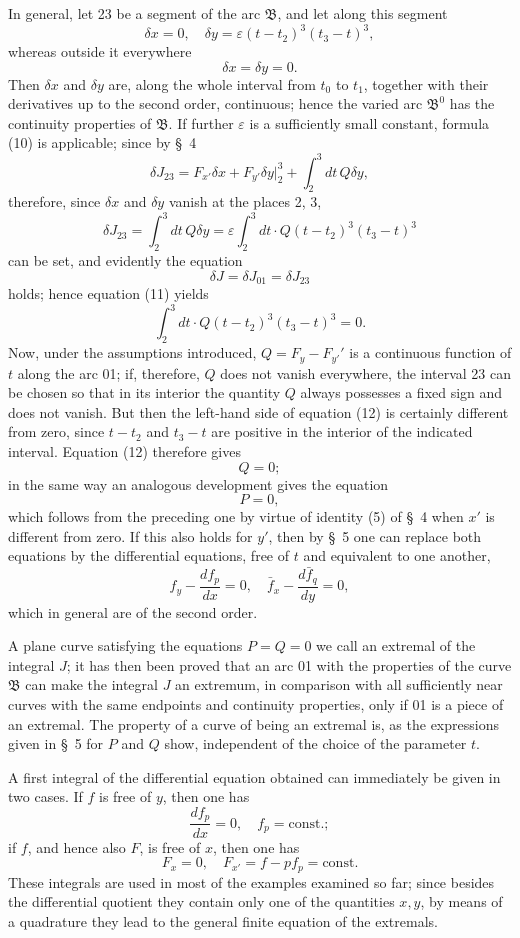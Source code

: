 \documentclass[11pt,a4paper,leqno]{article}
\begin{document}
In general, let 23 be a segment of the arc $\mathfrak{B}$, and let along this segment
\[
\delta x=0,\quad \delta y=\varepsilon(t-t_2)^3(t_3-t)^3,
\]
whereas outside it everywhere
\[
\delta x=\delta y=0.
\]
Then $\delta x$ and $\delta y$ are, along the whole interval from $t_0$ to $t_1$, together with their derivatives up to the second order, continuous; hence the varied arc $\mathfrak{B}^0$ has the continuity properties of $\mathfrak{B}$. If further $\varepsilon$ is a sufficiently small constant, formula (10) is applicable; since by \S~4
\[
\delta J_{23}=F_{x'}\delta x+F_{y'}\delta y\bigg|_2^3+\int_2^3 dt\,Q\delta y,
\]
therefore, since $\delta x$ and $\delta y$ vanish at the places 2, 3,
\[
\delta J_{23}=\int_2^3 dt\,Q\delta y=\varepsilon\int_2^3 dt\cdot Q(t-t_2)^3(t_3-t)^3
\]
can be set, and evidently the equation
\[
\delta J=\delta J_{01}=\delta J_{23}
\]
holds; hence equation (11) yields
\begin{equation}\tag{12}
\int_2^3 dt\cdot Q(t-t_2)^3(t_3-t)^3=0.
\end{equation}
Now, under the assumptions introduced, $Q=F_y-F_{y'}'$ is a continuous function of $t$ along the arc 01; if, therefore, $Q$ does not vanish everywhere, the interval 23 can be chosen so that in its interior the quantity $Q$ always possesses a fixed sign and does not vanish. But then the left-hand side of equation (12) is certainly different from zero, since $t-t_2$ and $t_3-t$ are positive in the interior of the indicated interval. Equation (12) therefore gives
\[
Q=0;
\]
in the same way an analogous development gives the equation
\[
P=0,
\]
which follows from the preceding one by virtue of identity (5) of \S~4 when $x'$ is different from zero. If this also holds for $y'$, then by \S~5 one can replace both equations by the differential equations, free of $t$ and equivalent to one another,
\[
f_y-\frac{df_p}{dx}=0,\quad \bar f_x-\frac{d\bar f_q}{dy}=0,
\]
which in general are of the second order.

A plane curve satisfying the equations $P=Q=0$ we call an extremal of the integral $J$; it has then been proved that an arc 01 with the properties of the curve $\mathfrak{B}$ can make the integral $J$ an extremum, in comparison with all sufficiently near curves with the same endpoints and continuity properties, only if 01 is a piece of an extremal. The property of a curve of being an extremal is, as the expressions given in \S~5 for $P$ and $Q$ show, independent of the choice of the parameter $t$.

A first integral of the differential equation obtained can immediately be given in two cases. If $f$ is free of $y$, then one has
\[
\frac{df_p}{dx}=0,\quad f_p=\mathrm{const.};
\]
if $f$, and hence also $F$, is free of $x$, then one has
\[
F_x=0,\quad F_{x'}=f-pf_p=\mathrm{const.}
\]
These integrals are used in most of the examples examined so far; since besides the differential quotient they contain only one of the quantities $x,y$, by means of a quadrature they lead to the general finite equation of the extremals.
\end{document}
